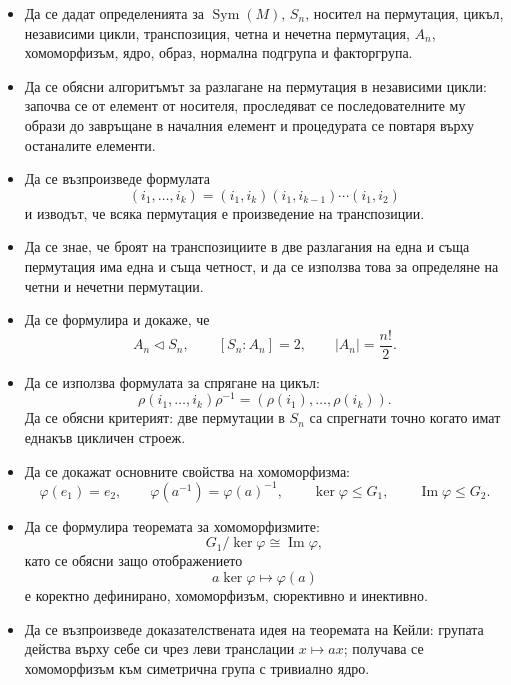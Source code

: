 \begin{itemize}
\item Да се дадат определенията за $\operatorname{Sym}(M)$, $S_n$, носител на пермутация, цикъл, независими цикли, транспозиция, четна и нечетна пермутация, $A_n$, хомоморфизъм, ядро, образ, нормална подгрупа и факторгрупа.

\item Да се обясни алгоритъмът за разлагане на пермутация в независими цикли: започва се от елемент от носителя, проследяват се последователните му образи до завръщане в началния елемент и процедурата се повтаря върху останалите елементи.

\item Да се възпроизведе формулата
\[
(i_1,\ldots,i_k)
=
(i_1,i_k)(i_1,i_{k-1})\cdots(i_1,i_2)
\]
и изводът, че всяка пермутация е произведение на транспозиции.

\item Да се знае, че броят на транспозициите в две разлагания на една и съща пермутация има една и съща четност, и да се използва това за определяне на четни и нечетни пермутации.

\item Да се формулира и докаже, че
\[
A_n\triangleleft S_n,\qquad [S_n:A_n]=2,\qquad |A_n|=\frac{n!}{2}.
\]

\item Да се използва формулата за спрягане на цикъл:
\[
\rho(i_1,\ldots,i_k)\rho^{-1}
=
(\rho(i_1),\ldots,\rho(i_k)).
\]
Да се обясни критерият: две пермутации в $S_n$ са спрегнати точно когато имат еднакъв цикличен строеж.

\item Да се докажат основните свойства на хомоморфизма:
\[
\varphi(e_1)=e_2,
\qquad
\varphi(a^{-1})=\varphi(a)^{-1},
\qquad
\ker\varphi\le G_1,
\qquad
\operatorname{Im}\varphi\le G_2.
\]

\item Да се формулира теоремата за хомоморфизмите:
\[
G_1/\ker\varphi\cong\operatorname{Im}\varphi,
\]
като се обясни защо отображението
\[
a\ker\varphi\longmapsto\varphi(a)
\]
е коректно дефинирано, хомоморфизъм, сюрективно и инективно.

\item Да се възпроизведе доказателствената идея на теоремата на Кейли: групата действа върху себе си чрез леви транслации $x\mapsto ax$; получава се хомоморфизъм към симетрична група с тривиално ядро.
\end{itemize}
